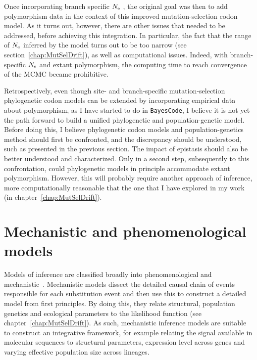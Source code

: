 Once incorporating branch specific $N_{\text{e}}$ , the original goal was then to add polymorphism data in the context of this improved mutation-selection codon model.
As it turns out, however, there are other issues that needed to be addressed, before achieving this integration.
In particular, the fact that the range of $N_{\text{e}}$ inferred by the model turns out to be too narrow (see section~\ref{chap:MutSelDrift}), as well as computational issues.
Indeed, with branch-specific $N_{\text{e}}$ and extant polymorphism, the computing time to reach convergence of the \acrshort{MCMC} became prohibitive.

Retrospectively, even though site- and branch-specific mutation-selection phylogenetic codon models can be extended by incorporating empirical data about polymorphism, as I have started to do in \texttt{BayesCode}, I believe it is not yet the path forward to build a unified phylogenetic and population-genetic model.
Before doing this, I believe phylogenetic codon models and population-genetics method should first be confronted, and the discrepancy should be understood, such as presented in the previous section.
The impact of epistasis should also be better understood and characterized.
Only in a second step, subsequently to this confrontation, could phylogenetic models in principle accommodate extant polymorphism.
However, this will probably require another approach of inference, more computationally reasonable that the one that I have explored in my work (in chapter~\ref{chap:MutSelDrift}).


\section{Mechanistic and phenomenological models}
\label{sec:mechanistic-and-phenomenological-models}

Models of inference are classified broadly into phenomenological and mechanistic~\citep{Rodrigue2010a}.
Mechanistic models dissect the detailed causal chain of events responsible for each substitution event and then use this to construct a detailed model from first principles.
By doing this, they relate structural, population genetics and ecological parameters to the likelihood function (see chapter~\ref{chap:MutSelDrift}).
As such, mechanistic inference models are suitable to construct an integrative framework, for example relating the signal available in molecular sequences to structural parameters, expression level across genes and varying effective population size across lineages.

